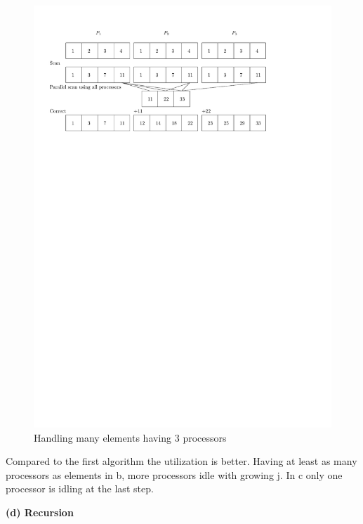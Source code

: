 \documentclass[a4paper,twoside,11pt]{article}
\begin{document}
\begin{figure}[hbtp]
\centering
\label{fig:le}
\includegraphics[scale=1]{le}
\caption{Handling many elements having 3 processors}
\end{figure}

Compared to the first algorithm the utilization is better. Having at least as many processors as elements in b, more processors idle with growing j. In c only one processor is idling at the last step.

\newpage
\textbf{(d) Recursion}
\end{document}
